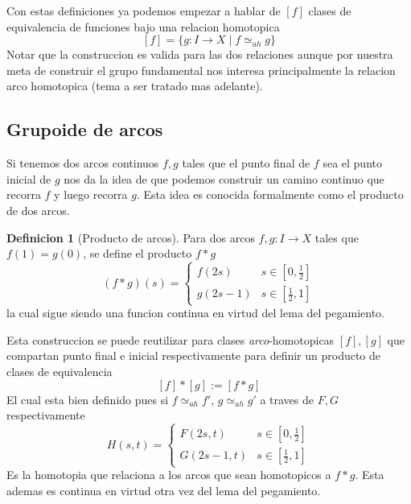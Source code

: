 \documentclass[letterpaper]{article}
\theoremstyle{definition}
\newtheorem{definicion}{Definicion}
\theoremstyle{plain}
\theoremstyle{plain}
\theoremstyle{remark}
\begin{document}
Con estas definiciones ya podemos empezar a hablar de \([f]\) clases
de equivalencia de funciones bajo una relacion homotopica
\[ [f] = \{ g : I \to X \mid f \simeq_{ah} g \} \]
Notar que la construccion es valida para las dos relaciones aunque por
nuestra meta de construir el grupo fundamental nos interesa
principalmente la relacion arco homotopica (tema a ser tratado mas adelante).

\subsection{Grupoide de arcos}
Si tenemos dos arcos continuos \(f,g\) tales que el punto final de \(f\)
sea el punto inicial de \(g\) nos da la idea de que podemos construir un
camino continuo que recorra \(f\) y luego recorra \(g\). Esta idea es
conocida formalmente como el producto de dos arcos.

\begin{definicion}[Producto de arcos]
Para dos arcos \(f,g : I \to X\) tales que
\(f(1) = g(0)\), se define el producto \(f * g \)
\[ (f*g) (s) = \begin{cases}
    f(2s) & s \in [0,\frac{1}{2}] \\
    g(2s - 1) & s \in [\frac{1}{2} , 1]
  \end{cases}
\]
la cual sigue siendo una funcion continua en virtud del lema del
pegamiento.
\end{definicion}

Esta construccion se puede reutilizar para clases
\emph{arco}-homotopicas \([f],[g]\) que compartan punto final e inicial
respectivamente para definir un producto de clases de equivalencia
\[ [f] * [g] := [f * g]\]
El cual esta bien definido pues si \(f \simeq_{ah} f'\), \(g \simeq_{ah}
g'\) a traves de \(F, G\) respectivamente
\[H(s,t) = \begin{cases}
    F(2s,t) & s \in [0, \frac{1}{2}] \\
    G(2s - 1, t) & s \in [\frac{1}{2} , 1]
  \end{cases}
\]
Es la homotopia que relaciona a los arcos que sean homotopicos a
\(f*g\). Esta ademas es continua en virtud otra vez del lema del pegamiento.
\end{document}
